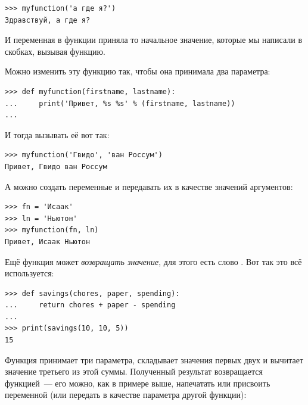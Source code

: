 \begin{listing}
\begin{verbatim}
>>> myfunction('а где я?')
Здравствуй, а где я?
\end{verbatim}
\end{listing}

И переменная  в функции приняла то начальное значение, которые мы написали в скобках, вызывая функцию.

Можно изменить эту функцию так, чтобы она принимала два параметра:

\begin{listing}
\begin{verbatim}
>>> def myfunction(firstname, lastname):
...     print('Привет, %s %s' % (firstname, lastname))
...
\end{verbatim}
\end{listing}

И тогда вызывать её вот так:

\begin{listing}
\begin{verbatim}
>>> myfunction('Гвидо', 'ван Россум')
Привет, Гвидо ван Россум
\end{verbatim}
\end{listing}

А можно создать переменные и передавать их в качестве значений аргументов:

\begin{listing}
\begin{verbatim}
>>> fn = 'Исаак'
>>> ln = 'Ньютон'
>>> myfunction(fn, ln)
Привет, Исаак Ньютон
\end{verbatim}
\end{listing}

Ещё функция может \emph{возвращать значение}, для этого есть слово . Вот так это всё используется:

\begin{listing}
\begin{verbatim}
>>> def savings(chores, paper, spending):
...     return chores + paper - spending
...
>>> print(savings(10, 10, 5))
15
\end{verbatim}
\end{listing}

Функция принимает три параметра, складывает значения первых двух и вычитает значение третьего из этой суммы. Полученный результат возвращается функцией — его можно, как в примере выше, напечатать или присвоить переменной (или передать в качестве параметра другой функции):

